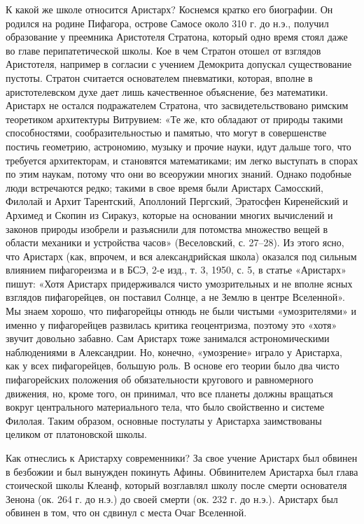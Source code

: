 К какой  же школе относится  Аристарх? Коснемся кратко  его биографии.
Он  родился  на  родине  Пифагора,  острове Самосе  около  310  г.  до
н.э.,  получил образование  у преемника  Аристотеля Стратона,  который
одно  время  стоял  даже  во   главе  перипатетической  школы.  Кое  в
чем  Стратон отошел  от  взглядов Аристотеля,  например  в согласии  с
учением  Демокрита допускал  существование пустоты.  Стратон считается
основателем пневматики,  которая, вполне  в аристотелевском  духе дает
лишь  качественное объяснение,  без  математики.  Аристарх не  остался
подражателем  Стратона,  что  засвидетельствовано  римским  теоретиком
архитектуры  Витрувием:  «Те  же,   кто  обладают  от  природы  такими
способностями, сообразительностью и памятью,  что могут в совершенстве
постичь  геометрию, астрономию,  музыку  и прочие  науки, идут  дальше
того, что требуется архитекторам,  и становятся математиками; им легко
выступать  в  спорах по  этим  наукам,  потому  что они  во  всеоружии
многих знаний. Однако  подобные люди встречаются редко;  такими в свое
время были  Аристарх Самосский, Филолай и  Архит Тарентский, Аполлоний
Пергский, Эратосфен Киренейский и Архимед и Скопин из Сиракуз, которые
на основании многих вычислений и законов природы изобрели и разъяснили
для потомства множество  вещей в области механики  и устройства часов»
(Веселовский, с. 27--28). Из этого ясно, что Аристарх (как, впрочем, и
вся александрийская школа) оказался  под сильным влиянием пифагореизма
и в БСЭ, 2-е изд., т. 3,  1950, с. 5, в статье «Аристарх» пишут: «Хотя
Аристарх придерживался чисто умозрительных  и не вполне ясных взглядов
пифагорейцев, он поставил  Солнце, а не Землю в  центре Вселенной». Мы
знаем хорошо,  что пифагорейцы  отнюдь не были  чистыми «умозрителями»
и  именно  у  пифагорейцев  развилась  критика  геоцентризма,  поэтому
это  «хотя»  звучит  довольно  забавно. Сам  Аристарх  тоже  занимался
астрономическими наблюдениями в  Александрии. Но, конечно, «умозрение»
играло у  Аристарха, как у  всех пифагорейцев, большую роль.  В основе
его теории  было два  чисто пифагорейских положения  об обязательности
кругового и  равномерного движения, но,  кроме того, он  принимал, что
все планеты  должны вращаться вокруг центрального  материального тела,
что  было  свойственно  и  системе Филолая.  Таким  образом,  основные
постулаты у Аристарха заимствованы целиком от платоновской школы.

Как  отнеслись  к  Аристарху  современники? За  свое  учение  Аристарх
был  обвинен в  безбожии и  был вынужден  покинуть Афины.  Обвинителем
Аристарха был глава стоической  школы Клеанф, который возглавлял школу
после смерти  основателя Зенона (ок. 264  г. до н.э.) до  своей смерти
(ок. 232  г. до н.э.).  Аристарх был обвинен в  том, что он  сдвинул с
места Очаг Вселенной.

